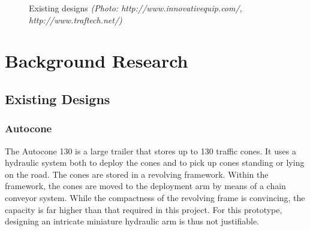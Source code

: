\documentclass[11pt]{report}
\newcommand{\credit}[1]{\textit{(Photo: #1)}}
\begin{document}
\begin{figure}[h!]
  \centering
  \hspace{20pt}                
   \caption{Existing designs \credit{http://www.innovativequip.com/, http://www.traftech.net/}}
  \label{fig:exisitingdesigns}
\end{figure}
\section{Background Research}

\subsection{Existing Designs}
\subsubsection{Autocone}
The Autocone 130 is a large trailer that stores up to 130 traffic cones. It uses a hydraulic system both to deploy the cones and to pick up cones standing or lying on the road. The cones are stored in a revolving framework. Within the framework, the cones are moved to the deployment arm by means of a chain conveyor system. While the compactness of the revolving frame is convincing, the capacity is far higher than that required in this project. For this prototype, designing an intricate miniature hydraulic arm is thus not justifiable.
\end{document}

